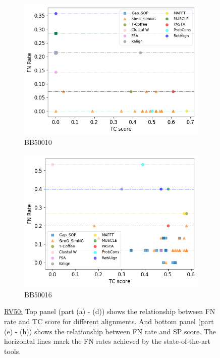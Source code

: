 \begin{figure}[!htbp]
\begin{adjustwidth}{-1cm}{-1cm}
\begin{subfigure}{0.22\textwidth}
			\includegraphics[width=\columnwidth]{Figure/summary/precomputedInit/Balibase/BB50010_fnrate_vs_tc_2}
			\caption{BB50010}
		\end{subfigure}
		\begin{subfigure}{0.22\textwidth}
			\includegraphics[width=\columnwidth]{Figure/summary/precomputedInit/Balibase/BB50016_fnrate_vs_tc_2}
			\caption{BB50016}
		\end{subfigure}	
		\caption{\underline{RV50:} Top panel (part (a) - (d)) shows the relationship between FN rate and TC score for different alignments. And bottom panel (part (e) - (h)) shows the relationship between FN rate and SP score. The horizontal lines mark the FN rates achieved by the state-of-the-art tools.}
		\label{fig:rv50_fnrate_vs_tc}
	\end{adjustwidth}
\end{figure}
